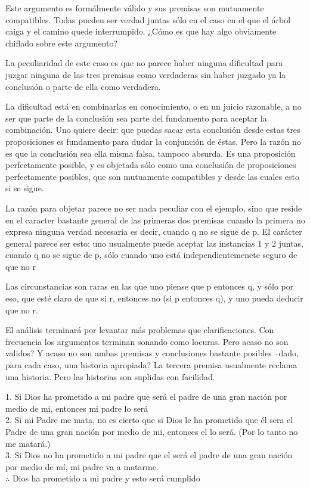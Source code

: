 Este argumento es formálmente válido y sus premisas son mutuamente compatibles.
Todas pueden ser verdad juntas sólo en el caso en el que el árbol caiga y el
camino quede interrumpido. ¿Cómo es que hay algo obviamente chiflado sobre este
argumento?

La peculiaridad de este caso es que no parece haber ninguna dificultad para
juzgar ninguna de las tres premisas como verdaderas sin haber juzgado ya la
conclusión o parte de ella como verdadera.

La dificultad está en combinarlas en conocimiento, o en un juicio razonable,
a no ser que parte de la conclusión sea parte del fundamento para aceptar la
combinación. Uno quiere decir: que puedas sacar esta conclusión desde estas tres
proposiciones es fundamento para dudar la conjunción de éstas. Pero la razón no
es que la conclusión sea ella misma falsa, tampoco absurda. Es una proposición
perfectamente posible, y es objetada sólo como una conclusión de proposiciones
perfectamente posibles, que son mutuamente compatibles y desde las cuales esto
si se sigue.


La razón para objetar parece no ser nada peculiar con el ejemplo, sino que
reside en el caracter bastante general de las primeras dos premisas cuando la
primera no expresa ninguna verdad necesaria es decir, cuando q no se sigue de p.
El carácter general parece ser esto: uno usualmente puede aceptar las instancias
1 y 2 juntas, cuando q no se sigue de p, sólo cuando uno está
independientemenete seguro de que no r

Las circunstancias son raras en las que uno piense que p entonces q, y sólo por
eso, que esté claro de que si r, entonces no (si p entonces q), y uno pueda
deducir que no r.

El análisis terminará por levantar más problemas
que clarificaciones. Con frecuencia los argumentos terminan sonando como
locuras. Pero acaso no son validos? Y acaso no son ambas premisas y conclusiones
bastante posibles --dado, para cada caso, una historia apropiada?
La tercera premisa usualmente reclama una historia. Pero las historias son
suplidas con facilidad.



\begin{adjustwidth}{1.2cm}{}
  1. Si Dios ha prometido a mi padre que será el padre de una gran nación por
  medio de mi, entonces mi padre lo será\\
  2. Si mi Padre me mata, no es cierto que si Dios le ha prometido que él sera
  el Padre de una gran nación por medio de mi, entonces el lo será.
  (Por lo tanto no me matará.)\\
  3. Si Dios no ha prometido a mi padre que el será el padre de una gran nación
  por medio de mí, mi padre va a matarme.\\
  $\therefore$ Dios ha prometido a mi padre y esto será cumplido\\
\end{adjustwidth}

